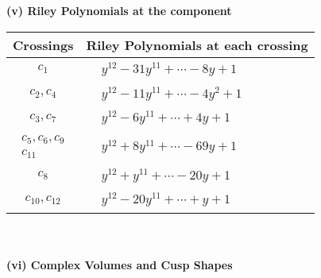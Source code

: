 \documentclass[1p]{elsarticle_modified}
\theoremstyle{definition}
\begin{document}
\newpage\renewcommand{\arraystretch}{1}
\flushleft \textbf{(v) Riley Polynomials at the component}\newline \\
\begin{tabular}{m{50pt}|m{274pt}}
Crossings & \hspace{64pt}Riley Polynomials at each crossing \\
\hline $$\begin{aligned}c_{1}\end{aligned}$$&$\begin{aligned}
&y^{12}-31 y^{11}+\cdots-8 y+1
\end{aligned}$\\
\hline $$\begin{aligned}c_{2},c_{4}\end{aligned}$$&$\begin{aligned}
&y^{12}-11 y^{11}+\cdots-4 y^2+1
\end{aligned}$\\
\hline $$\begin{aligned}c_{3},c_{7}\end{aligned}$$&$\begin{aligned}
&y^{12}-6 y^{11}+\cdots+4 y+1
\end{aligned}$\\
\hline $$\begin{aligned}c_{5},c_{6},c_{9}\\c_{11}\end{aligned}$$&$\begin{aligned}
&y^{12}+8 y^{11}+\cdots-69 y+1
\end{aligned}$\\
\hline $$\begin{aligned}c_{8}\end{aligned}$$&$\begin{aligned}
&y^{12}+y^{11}+\cdots-20 y+1
\end{aligned}$\\
\hline $$\begin{aligned}c_{10},c_{12}\end{aligned}$$&$\begin{aligned}
&y^{12}-20 y^{11}+\cdots+y+1
\end{aligned}$\\
\hline
\end{tabular}\\~\\
\newpage\flushleft \textbf{(vi) Complex Volumes and Cusp Shapes}
\end{document}
